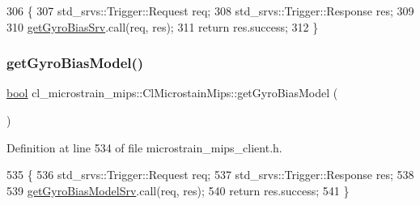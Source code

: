 \begin{DoxyCode}
306     \{
307         std\_srvs::Trigger::Request req;
308         std\_srvs::Trigger::Response res;
309 
310         \hyperlink{classcl__microstrain__mips_1_1ClMicrostainMips_a2f3eaec7f31a54d833773ebb5eb03b64}{getGyroBiasSrv}.call(req, res);
311         \textcolor{keywordflow}{return} res.success;
312     \}
\end{DoxyCode}
\mbox{\label{classcl__microstrain__mips_1_1ClMicrostainMips_a9a4353f87640e524750cf919bdcdbf2d}} 
\subsubsection{\texorpdfstring{get\+Gyro\+Bias\+Model()}{getGyroBiasModel()}}
{\footnotesize\ttfamily \hyperlink{classbool}{bool} cl\+\_\+microstrain\+\_\+mips\+::\+Cl\+Microstain\+Mips\+::get\+Gyro\+Bias\+Model (\begin{DoxyParamCaption}{ }\end{DoxyParamCaption})\hspace{0.3cm}{\ttfamily [inline]}}



Definition at line 534 of file microstrain\+\_\+mips\+\_\+client.\+h.


\begin{DoxyCode}
535     \{
536         std\_srvs::Trigger::Request req;
537         std\_srvs::Trigger::Response res;
538 
539         \hyperlink{classcl__microstrain__mips_1_1ClMicrostainMips_a4caf935b9d839aa586b562982cfc3adb}{getGyroBiasModelSrv}.call(req, res);
540         \textcolor{keywordflow}{return} res.success;
541     \}
\end{DoxyCode}
\mbox{\label{classcl__microstrain__mips_1_1ClMicrostainMips_a7e54b1b4fb3ccdc5d2a845e52caf2f17}} 

